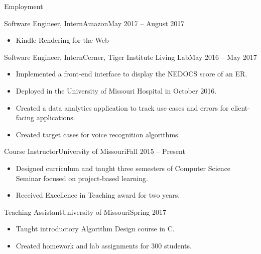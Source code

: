 \documentclass[]{mcdowellcv}
\begin{document}
    \begin{cvsection}{Employment}
        \begin{cvsubsection}{Software Engineer, Intern}{Amazon}{May 2017 -- August 2017}
            \begin{itemize}
            \item Kindle Rendering for the Web
            \end{itemize}
        \end{cvsubsection}

        \begin{cvsubsection}{Software Engineer, Intern}{Cerner, Tiger Institute Living Lab}{May 2016 -- May 2017}		
            \begin{itemize}
                \item Implemented a front-end interface to display the NEDOCS score of an ER.
                \item Deployed in the University of Missouri Hospital in October 2016.
                \item Created a data analytics application to track use cases and errors for client-facing applications.
                \item Created target cases for voice recognition algorithms.
            \end{itemize}
        \end{cvsubsection}
        
        \begin{cvsubsection}{Course Instructor}{University of Missouri}{Fall 2015 -- Present}
            \begin{itemize}
                \item Designed curriculum and taught three semesters of Computer Science Seminar focused on project-based learning.
                \item Received Excellence in Teaching award for two years.
            \end{itemize}
        \end{cvsubsection}
        
        \begin{cvsubsection}{Teaching Assistant}{University of Missouri}{Spring 2017}
            \begin{itemize}
                \item Taught introductory Algorithm Design course in C.
                \item Created homework and lab assignments for 300 students.
            \end{itemize}
        \end{cvsubsection}

    \end{cvsection}	
    
\end{document}
